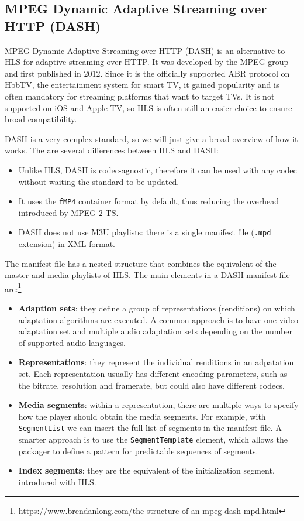 \subsection{MPEG Dynamic Adaptive Streaming over HTTP (DASH)}
\label{sec:bg/technologies/dash}

MPEG Dynamic Adaptive Streaming over HTTP (DASH) is an alternative to HLS for adaptive streaming over HTTP. It was developed by the MPEG group and first published in 2012. Since it is the officially supported ABR protocol on HbbTV, the entertainment system for smart TV, it gained popularity and is often mandatory for streaming platforms that want to target TVs. It is not supported on iOS and Apple TV, so HLS is often still an easier choice to ensure broad compatibility.

DASH is a very complex standard, so we will just give a broad overview of how it works.\cite{dash}\cite{dash2} The are several differences between HLS and DASH:

\begin{itemize}
    \item Unlike HLS, DASH is codec-agnostic, therefore it can be used with any codec without waiting the standard to be updated.
    \item It uses the \texttt{fMP4} container format by default, thus reducing the overhead introduced by MPEG-2 TS.
    \item DASH does not use M3U playlists: there is a single manifest file (\texttt{.mpd} extension) in XML format.
\end{itemize}

The manifest file has a nested structure that combines the equivalent of the master and media playlists of HLS. The main elements in a DASH manifest file are:\footnote{\url{https://www.brendanlong.com/the-structure-of-an-mpeg-dash-mpd.html}}

\begin{itemize}
    \item \textbf{Adaption sets}: they define a group of representations (renditions) on which adaptation algorithms are executed. A common approach is to have one video adaptation set and multiple audio adaptation sets depending on the number of supported audio languages.
    \item \textbf{Representations}: they represent the individual renditions in an adpatation set. Each representation usually has different encoding parameters, such as the bitrate, resolution and framerate, but could also have different codecs.
    \item \textbf{Media segments}: within a representation, there are multiple ways to specify how the player should obtain the media segments. For example, with \texttt{SegmentList} we can insert the full list of segments in the manifest file. A smarter approach is to use the \texttt{SegmentTemplate} element, which allows the packager to define a pattern for predictable sequences of segments.
    \item \textbf{Index segments}: they are the equivalent of the initialization segment, introduced with HLS.
\end{itemize}

